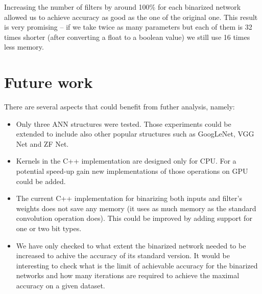 \documentclass[licencjacka]{pracamgr}
\begin{document}
		Increasing the number of filters by around 100\% for each binarized network allowed us to achieve accuracy as good as the one of the original one. This result is very promising -- if we take twice as many parameters but each of them is 32 times shorter (after converting a float to a boolean value) we still use 16 times less memory.

	\section{Future work}
		There are several aspects that could benefit from futher analysis, namely:
		\begin{itemize}
			\item Only three ANN structures were tested. Those experiments could be extended to include also other popular structures such as GoogLeNet, VGG Net and ZF Net.
			\item Kernels in the C++ implementation are designed only for CPU. For a potential speed-up gain new implementations of those operations on GPU could be added. 
			\item The current C++ implementation for binarizing both inputs and filter's weights does not save any memory (it uses as much memory as the standard convolution operation does). This could be improved by adding support for one or two bit types. 
			\item We have only checked to what extent the binarized network needed to be increased to achive the accuracy of its standard version. It would be interesting to check what is the limit of achievable accuracy for the binarized networks and how many iterations are required to achieve the maximal accuracy on a given dataset.
		\end{itemize} 
\end{document}

